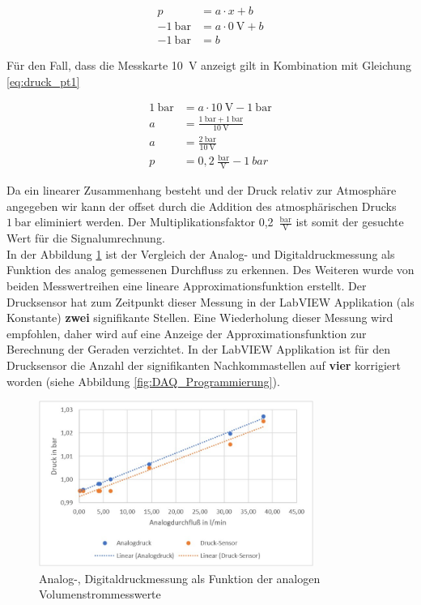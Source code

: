 \begin{align}
p&=a \cdot x+b \\
-1~\mathrm{bar} &= a \cdot 0~\mathrm{V}+b \\
-1~\mathrm{bar} &=b \label{eq:druck_pt1}
\end{align}

Für den Fall, dass die Messkarte 10~$\mathrm{V}$ anzeigt gilt in Kombination mit Gleichung \ref{eq:druck_pt1}

\begin{align}
1~\mathrm{bar} &=a \cdot 10~\mathrm{V} -1~\mathrm{bar} \\[0.5em]
a &= \frac{1~\mathrm{bar}+1~\mathrm{bar}}{10~\mathrm{V}} \\[0.5em]
a &= \frac{2~\mathrm{bar}}{10~\mathrm{V}} \\[0.5em]
p &= 0,2~\frac{\mathrm{bar}} {\mathrm{V}}-1~bar
\end{align}

Da ein linearer Zusammenhang besteht und der Druck relativ zur Atmosphäre angegeben wir kann der offset durch die Addition des atmosphärischen Drucks $1~\mathrm{bar}$ eliminiert werden. Der Multiplikationsfaktor 0,2~$\frac{\mathrm{bar}}{\mathrm{V}}$ ist somit der gesuchte Wert für die Signalumrechnung.\\

In der Abbildung \ref{fig:analog-digitaldrucksensor} ist der Vergleich der Analog- und Digitaldruckmessung als Funktion des analog gemessenen Durchfluss zu erkennen. Des Weiteren wurde von beiden Messwertreihen eine lineare Approximationsfunktion erstellt. Der Drucksensor hat zum Zeitpunkt dieser Messung in der LabVIEW Applikation (als Konstante) \textbf{zwei} signifikante Stellen. Eine Wiederholung dieser Messung wird empfohlen, daher wird auf eine Anzeige der Approximationsfunktion zur Berechnung der Geraden verzichtet. In der LabVIEW Applikation ist für den Drucksensor die Anzahl der signifikanten Nachkommastellen auf \textbf{vier} korrigiert worden (siehe Abbildung \ref{fig:DAQ_Programmierung}).\\

\begin{figure}[h!] %
\centering
\includegraphics[width=0.8\textwidth]{Bilder/analog-digitaldrucksensor.jpg}
\vspace{0em}
 \caption[Analog-, Digitaldruckmessung als Funktion der analogen Volumenstrommesswerte]
{Analog-, Digitaldruckmessung als Funktion der analogen Volumenstrommesswerte}\label{fig:analog-digitaldrucksensor}
\end{figure}

